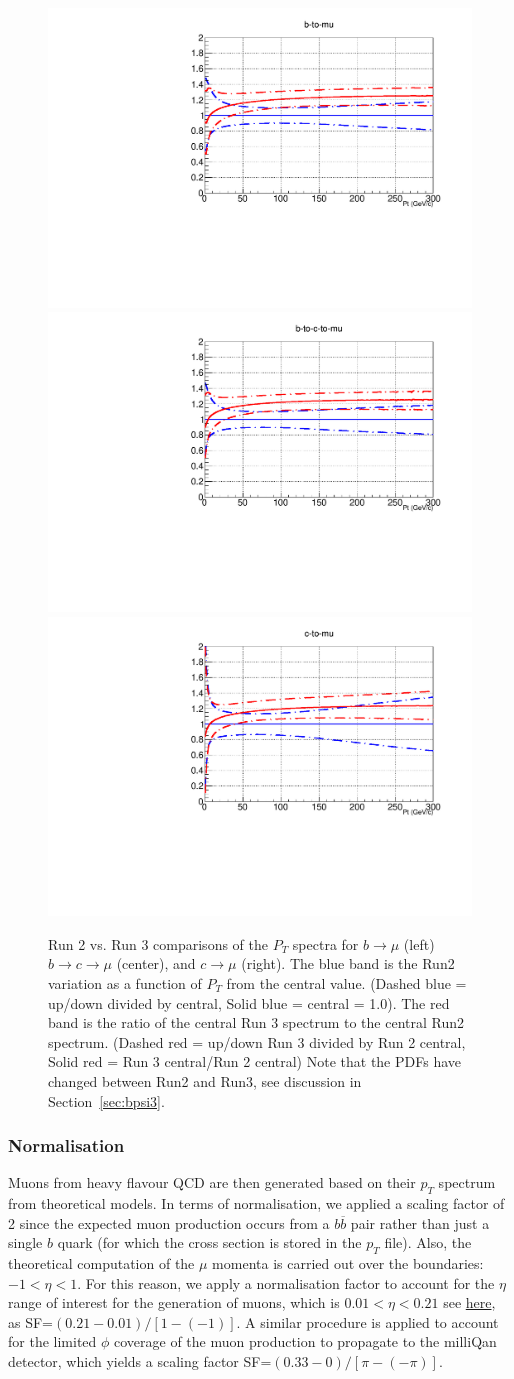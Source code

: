 \documentclass[12pt]{article}
\begin{document}
\begin{figure}[H]
\includegraphics[width=0.31\linewidth]{../muons/data/b-to-mu_Run2_Run3_comparison.pdf}
\includegraphics[width=0.31\linewidth]{../muons/data/b-to-c-to-mu_Run2_Run3_comparison.pdf}
\includegraphics[width=0.31\linewidth]{../muons/data/c-to-mu_Run2_Run3_comparison.pdf}
\caption{Run 2 vs. Run 3 comparisons of the $P_T$ spectra for $b \to \mu$ (left)
    $b \to c \to \mu$ (center), and $c \to \mu$ (right).
      The blue band is the Run2 variation as a function of $P_T$ from the central value.
(Dashed blue = up/down divided by central, Solid blue = central = 1.0).
The red band is the ratio of the central Run 3 spectrum to the central Run2 spectrum.
(Dashed red = up/down Run 3 divided by Run 2 central, Solid red = Run 3 central/Run 2 central)
Note that the PDFs have changed between Run2 and Run3, see discussion
in Section~\ref{sec:bpsi3}.}
  \label{fig:bmuon23}
\end{figure}

\subsubsection{Normalisation}
Muons from heavy flavour QCD are then generated based on their $p_{T}$ spectrum from theoretical models. In terms of normalisation, we applied a scaling factor of 2 since the expected muon production occurs from a $b\overline{b}$ pair rather than just a single $b$ quark (for which the cross section is stored in the $p_{T}$ file). Also, the theoretical computation of the $\mu$ momenta is carried out over the boundaries: $-1 < \eta < 1$. For this reason, we apply a normalisation factor to account for the $\eta$ range of interest for the generation of muons, which is $ 0.01 < \eta < 0.21 $ see \href{https://github.com/claudiocc1/milliq\_mcgen/blob/master/muons/runMuons.cc#L23-L24}{here}, as SF=$ ( 0.21 - 0.01 )  / [ 1 - (-1) ]$. A similar procedure is applied to account for the limited $\phi$ coverage of the muon production to propagate to the milliQan detector, which yields a scaling factor SF=$ ( 0.33 - 0 ) / [ \pi - (-\pi) ]$.
\end{document}
